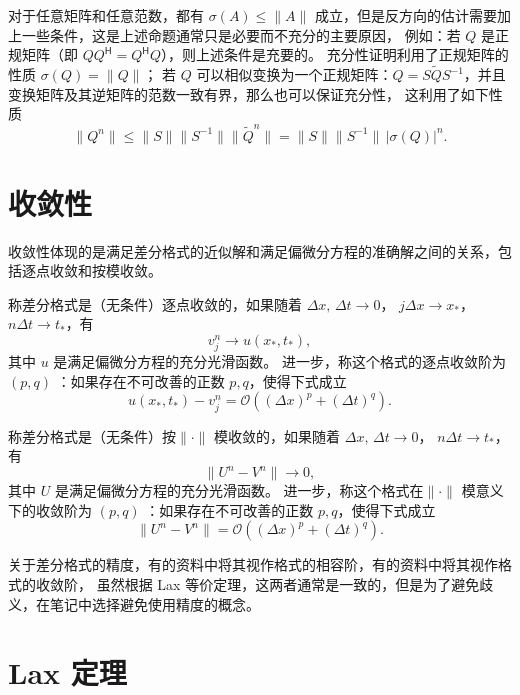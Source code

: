\begin{remark}
    对于任意矩阵和任意范数，都有 $\sigma(A) \le \|A\|$ 成立，但是反方向的估计需要加上一些条件，这是上述命题通常只是必要而不充分的主要原因，
    例如：若 $Q$ 是正规矩阵（即 $Q Q^\mathsf{H} = Q^\mathsf{H} Q$），则上述条件是充要的。
    充分性证明利用了正规矩阵的性质 $\sigma(Q) = \| Q \|$；
    若 $Q$ 可以相似变换为一个正规矩阵：$Q = S \tilde{Q} S^{-1}$，并且变换矩阵及其逆矩阵的范数一致有界，那么也可以保证充分性，
    这利用了如下性质
    \[
        \| Q^n \| \le \| S \| \| S^{-1} \| \| \tilde{Q}^n \| = \| S \| \| S^{-1} \|\, |\sigma(Q)|^n.
    \]
\end{remark}


\section{收敛性}

收敛性体现的是满足差分格式的近似解和满足偏微分方程的准确解之间的关系，包括逐点收敛和按模收敛。


\begin{definition}[逐点收敛性]
    称差分格式是（无条件）逐点收敛的，如果随着 $\Delta x,\,\Delta t \to 0$，
    $j\Delta x \to x_*$，$n \Delta t \to t_*$，有
    \[
        v_j^n \to u(x_*,t_*),
    \]
    其中 $u$ 是满足偏微分方程的充分光滑函数。
    进一步，称这个格式的逐点收敛阶为 $(p,q)$ ：如果存在不可改善的正数 $p,q$，使得下式成立
    \[
        u(x_*,t_*) - v_j^n = \mathcal{O}((\Delta x)^p + (\Delta t)^q).
    \]
\end{definition}

\begin{definition}[模收敛性]
    称差分格式是（无条件）按$\| \cdot \|$ 模收敛的，如果随着 $\Delta x,\,\Delta t \to 0$，
    $n \Delta t \to t_*$，有
    \[
        \|U^n - V^n\| \to 0,
    \]
    其中 $U$ 是满足偏微分方程的充分光滑函数。
    进一步，称这个格式在$\|\cdot\|$ 模意义下的收敛阶为 $(p,q)$ ：如果存在不可改善的正数 $p,q$，使得下式成立
    \[
        \|U^n - V^n\| = \mathcal{O}((\Delta x)^p + (\Delta t)^q).
    \]
\end{definition}

\begin{remark}
    关于差分格式的精度，有的资料中将其视作格式的相容阶，有的资料中将其视作格式的收敛阶，
    虽然根据 Lax 等价定理，这两者通常是一致的，但是为了避免歧义，在笔记中选择避免使用精度的概念。
\end{remark}

\section{Lax 定理}

